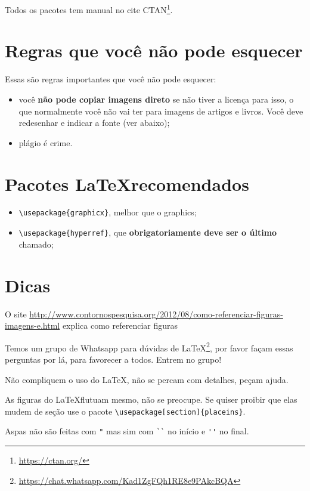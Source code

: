 \documentclass{article}
\begin{document}
Todos os pacotes tem manual no cite CTAN\footnote{\url{https://ctan.org/}}.

\section{Regras que você não pode esquecer}

Essas são regras importantes que você não pode esquecer:

\begin{itemize}
    \item você \textbf{não pode copiar imagens direto} se não tiver a licença para isso, o que normalmente você não vai ter para imagens de artigos e livros. Você deve redesenhar e indicar a fonte (ver abaixo);
    \item plágio é crime.
\end{itemize}



\section{Pacotes \LaTeX recomendados}

\begin{itemize}
    \item \verb!\usepackage{graphicx}!, melhor que o graphics;
    \item \verb!\usepackage{hyperref}!, que \textbf{obrigatoriamente deve ser o último} chamado;
\end{itemize}

\section{Dicas}

O site \url{http://www.contornospesquisa.org/2012/08/como-referenciar-figuras-imagens-e.html} explica como referenciar figuras

Temos um grupo de Whatsapp para dúvidas de \LaTeX\footnote{\url{https://chat.whatsapp.com/Kad1ZgFQh1RE8e9PAkcBQA}}, por favor façam essas perguntas por lá, para favorecer a todos. Entrem no grupo!

Não compliquem o uso do \LaTeX, não se percam com detalhes, peçam ajuda. 

As figuras do \LaTeX flutuam mesmo, não se preocupe. Se quiser proibir que elas mudem de seção use o pacote \verb!\usepackage[section]{placeins}!.

Aspas não são feitas com \verb!"! mas sim com \verb!``! no início e \verb!''! no final.
\end{document}
